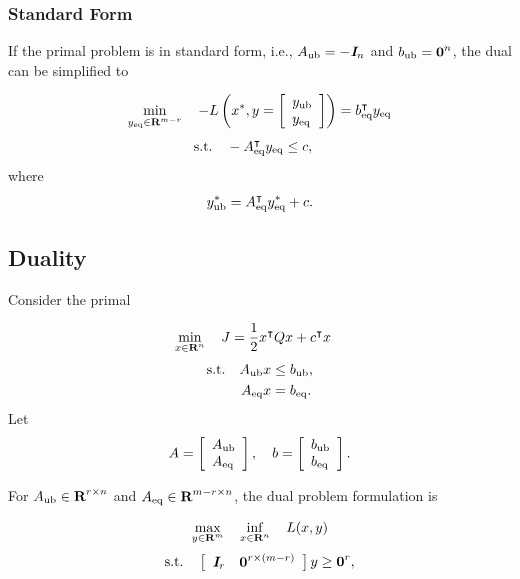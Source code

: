 \documentclass{article}
\begin{document}
    \subsubsection{Standard Form}
    If the primal problem is in standard form, i.e., $A_{\text{ub}} = -\emph{\textbf{I}}_n$ and $b_{\text{ub}}=\textbf{0}^n$,
    the dual can be simplified to \cite[p.~224]{bv_cvxbook}

    \begin{align*}
        \min_{y_{\text{eq}}\in \textbf{R}^{m-{r}} }\quad -L\left(x^*,y=\left[\begin{array}{lllllllllllllllllll}y_{\text{ub}}\\y_{\text{eq}}\end{array}\right]\right)=b_{\text{eq}}^\intercal y_{\text{eq}}
    \end{align*}
    \begin{align*}
        \text{s.t.}\quad -A_{\text{eq}}^\intercal y_{\text{eq}}&\leq c,
    \end{align*}
    where
    \begin{align*}
        y_{\text{ub}}^*=A_{\text{eq}}^\intercal y_{\text{eq}}^*+c.
    \end{align*}

\subsection{\QP Duality}

    Consider the primal \QP 

    \begin{align*}
        \min_{x\in\textbf{R}^n}\quad
        J
        &=\frac{1}{2} x^\intercal Q x + c^\intercal x
    \end{align*}
    \begin{align*}
        \text{s.t.}\quad A_{\text{ub}} x&\leq b_{\text{ub}},\\
        A_{\text{eq}} x &= b_{\text{eq}}.\\
    \end{align*}
    Let
    \begin{align*}
        A = \left[\begin{array}{lllllllllllllllllll}A_{\text{ub}} \\ A_{\text{eq}}\end{array}\right],\quad
        b = \left[\begin{array}{lllllllllllllllllll}b_{\text{ub}}\\b_{\text{eq}}\end{array}\right].
    \end{align*}


    For $A_{\text{ub}}\in\textbf{R}^{{r}\times n}$ and $A_{\text{eq}}\in\textbf{R}^{m-r\times n}$, the dual problem formulation is

    \begin{align*}
        \max_{y\in\textbf{R}^m}\quad 
        \inf_{x\in\textbf{R}^n}\quad L(x,y)
    \end{align*}
    \begin{align*}
        \text{s.t.}\quad  \left[\begin{array}{lllllllllllllllllll}\emph{\textbf{I}}_{r}&\textbf{0}^{{r}\times (m-{r})}\end{array}\right]y\geq \textbf{0}^{r},
    \end{align*}
\end{document}
